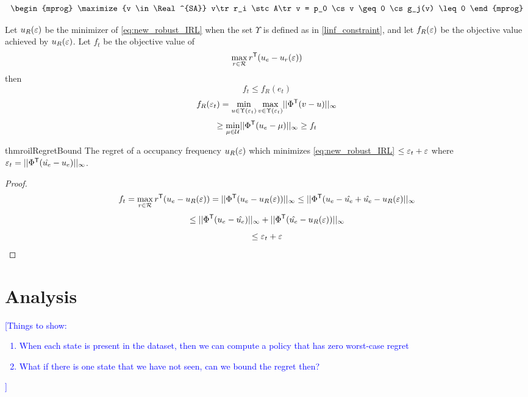\documentclass[10pt]{article}
\newcommand{\mm}[1]{\textcolor{blue}{[#1]}}
\begin{document}
\begin{equation}
    \begin{mprog}
        \maximize{v \in \Real^{SA}} v\tr r_i
        \stc A\tr v = p_0
        \cs v \geq 0
        \cs g_j(v) \leq 0
    \end{mprog}
\end{equation}

Let $u_R(\varepsilon)$ be the minimizer of \ref{eq:new_robust_IRL} when the set $\Upsilon$ is defined as in \ref{linf_constraint}, and let $f_R(\varepsilon)$ be the objective value achieved by $u_R(\varepsilon)$.
Let $f_t$ be the objective value of 
%
\[\max_{r\in\mathcal{R}} r^{\mathsf{T}} (u_e - u_r(\varepsilon))\]
%
then 
%
\[f_t \leq f_R(e_t)\]
\[f_R(\varepsilon_t) = \min_{u \in \Upsilon(\varepsilon_t)} \max_{v \in \Upsilon(\varepsilon_t)} \lvert\lvert \Phi^{\mathsf{T}} (v-u) \rvert\rvert_\infty\]
\[\geq \min_{\mu \in \mathcal{U}} \lvert\lvert \Phi^{\mathsf{T}} (u_e - \mu) \rvert\rvert_\infty \geq f_t\]
%  
\begin{restatable}{thm}{roilRegretBound}
\label{roilRegretBound}
The regret of a occupancy frequency $u_R(\varepsilon)$ which minimizes \ref{eq:new_robust_IRL} $\leq \varepsilon_t + \varepsilon$
where $\varepsilon_t = \lvert\lvert \Phi^{\mathsf{T}} (\hat{u_e} - u_e) \rvert\rvert_\infty$.
\end{restatable}
\begin{proof}
    \[f_t = \max_{r\in\mathcal{R}} r^{\mathsf{T}}(u_e - u_R(\varepsilon)) = \lvert\lvert \Phi^{\mathsf{T}} (u_e - u_R(\varepsilon)) \rvert\rvert_\infty \leq \lvert\lvert \Phi^{\mathsf{T}} (u_e - \hat{u_e} + \hat{u_e} - u_R(\varepsilon)\rvert\rvert_\infty\]
    \[\leq \lvert\lvert \Phi^{\mathsf{T}} (u_e-\hat{u_e}) \rvert\rvert_\infty + \lvert\lvert \Phi^{\mathsf{T}} (\hat{u_e} - u_R(\varepsilon)) \rvert\rvert_\infty\]
    \[\leq \varepsilon_t + \varepsilon\]
\end{proof}

\section{Analysis}
\mm{Things to show:
	\begin{enumerate}
		\item When each state is present in the dataset, then we can compute a policy that has zero worst-case regret
		\item What if there is one state that we have not seen, can we bound the regret then?
	\end{enumerate}
 }
\end{document}
